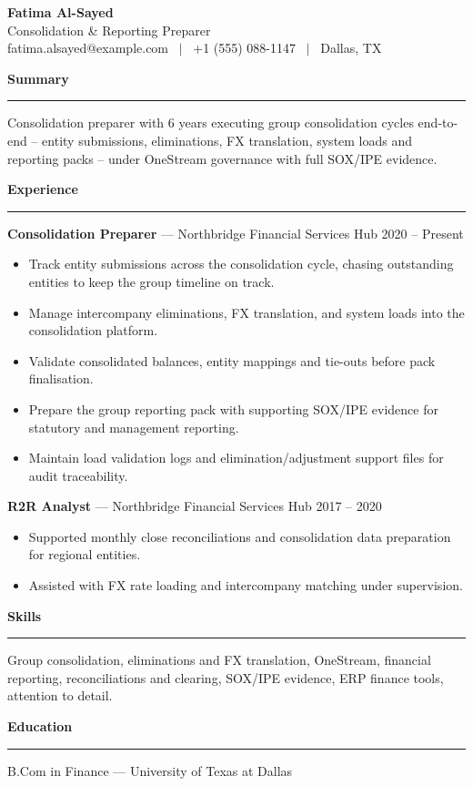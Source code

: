\documentclass[11pt]{article}
\newcommand{\rsection}[1]{%
  \vspace{10pt}
  {\large\bfseries #1}\\[-4pt]
  \rule{\linewidth}{0.6pt}\vspace{4pt}
}
\begin{document}
\begin{center}
  {\Huge\bfseries Fatima Al-Sayed}\\[4pt]
  Consolidation \& Reporting Preparer \\
  fatima.alsayed@example.com \ $\vert$ \ +1 (555) 088-1147 \ $\vert$ \ Dallas, TX
\end{center}

\rsection{Summary}
Consolidation preparer with 6 years executing group consolidation cycles end-to-end -- entity submissions, eliminations, FX translation, system loads and reporting packs -- under OneStream governance with full SOX/IPE evidence.

\rsection{Experience}
\textbf{Consolidation Preparer} --- Northbridge Financial Services Hub \hfill 2020 -- Present
\begin{itemize}
  \item Track entity submissions across the consolidation cycle, chasing outstanding entities to keep the group timeline on track.
  \item Manage intercompany eliminations, FX translation, and system loads into the consolidation platform.
  \item Validate consolidated balances, entity mappings and tie-outs before pack finalisation.
  \item Prepare the group reporting pack with supporting SOX/IPE evidence for statutory and management reporting.
  \item Maintain load validation logs and elimination/adjustment support files for audit traceability.
\end{itemize}

\textbf{R2R Analyst} --- Northbridge Financial Services Hub \hfill 2017 -- 2020
\begin{itemize}
  \item Supported monthly close reconciliations and consolidation data preparation for regional entities.
  \item Assisted with FX rate loading and intercompany matching under supervision.
\end{itemize}

\rsection{Skills}
Group consolidation, eliminations and FX translation, OneStream, financial reporting, reconciliations and clearing, SOX/IPE evidence, ERP finance tools, attention to detail.

\rsection{Education}
B.Com in Finance --- University of Texas at Dallas
\end{document}
